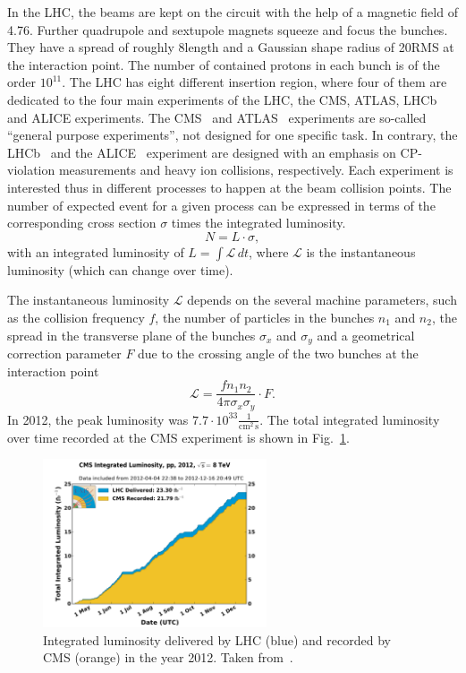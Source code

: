 In the LHC, the beams are kept on the circuit with the help of a magnetic field of 4.76\tesla.
Further quadrupole and sextupole magnets squeeze and focus the bunches.
They have a spread of roughly 8\cm length and a Gaussian shape radius of 20\mum RMS at the interaction point.
The number of contained protons in each bunch is of the order $10^{11}$.
The LHC has eight different insertion region, where four of them are dedicated to the four main experiments of the LHC, the CMS, ATLAS, LHCb and ALICE experiments.
The CMS~\cite{bib:CMS:experiment,bib:CMS:TDR} and ATLAS~\cite{bib:ATLAS:experiment,bib:ATLAS:TDR_1,bib:ATLAS:TDR_2} experiments are so-called ``general purpose experiments'', not designed for one specific task.
In contrary, the LHCb~\cite{bib:LHCb:experiment} and the ALICE~\cite{bib:ALICE:experiment} experiment are designed with an emphasis on CP-violation measurements and heavy ion collisions, respectively.
Each experiment is interested thus in different processes to happen at the beam collision points.
The number of expected event for a given process can be expressed in terms of the corresponding cross section $\sigma$ times the integrated luminosity.
\begin{equation}
N = L \cdot \sigma,
\end{equation}
with an integrated luminosity of $L=\int \mathcal{L}\, dt$, where $\mathcal{L}$ is the instantaneous luminosity (which can change over time).

The instantaneous luminosity $\mathcal{L}$ depends on the several machine parameters, such as the collision frequency $f$, the number of particles in the bunches $n_1$ and $n_2$,
the spread in the transverse plane of the bunches $\sigma_x$ and $\sigma_y$ and a geometrical correction parameter $F$ due to the crossing angle of the two bunches at the interaction point
\begin{equation}
\mathcal{L} = \frac{f n_1 n_2 }{4 \pi \sigma_x \sigma_y} \cdot F.
\end{equation}
In 2012, the peak luminosity was $7.7 \cdot 10^{33} \frac{1}{\text{cm}^2\,\text{s}}$.
The total integrated luminosity over time recorded at the CMS experiment is shown in Fig.~\ref{fig:Lumi}.

\begin{figure}[!b]
  \centering
      \includegraphics[width=0.59\textwidth]{figures/experiment/LHC/int_lumi_per_day_cumulative_pp_2012.pdf}
  \caption{Integrated luminosity delivered by LHC (blue) and recorded by CMS (orange) in the year 2012. Taken from~\cite{bib:LumiWiki}.}  
  \label{fig:Lumi}
\end{figure}






